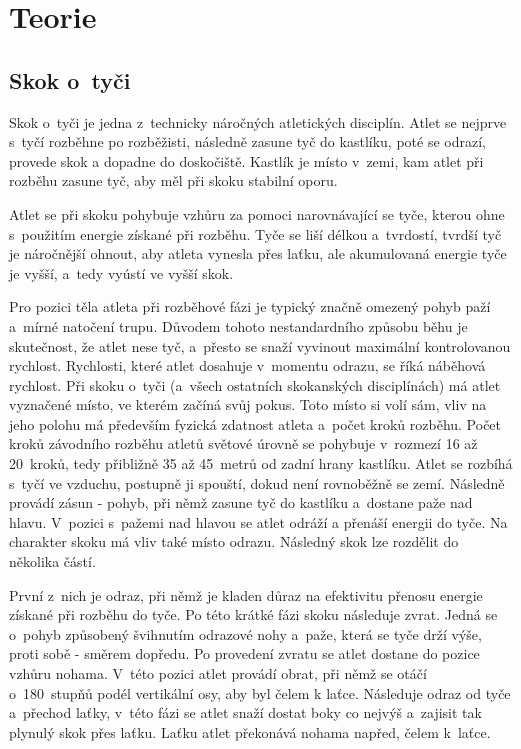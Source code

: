 \chapter{Teorie}

\section{Skok o~tyči}

Skok o~tyči je jedna z~technicky náročných atletických disciplín. Atlet se nejprve s~tyčí rozběhne po rozběžisti, následně zasune tyč do kastlíku, poté se odrazí, provede skok a dopadne do doskočiště. Kastlík je místo v~zemi, kam atlet při rozběhu zasune tyč, aby měl při skoku stabilní oporu.

Atlet se při skoku pohybuje vzhůru za pomoci narovnávající se tyče, kterou ohne s~použitím energie získané při rozběhu. Tyče se liší délkou a~tvrdostí, tvrdší tyč je náročnější ohnout, aby atleta vynesla přes laťku, ale akumulovaná energie tyče je vyšší, a~tedy vyústí ve vyšší skok.

Pro pozici těla atleta při rozběhové fázi je typický značně omezený pohyb paží a~mírné natočení trupu. Důvodem tohoto nestandardního způsobu běhu je skutečnost, že atlet nese tyč, a~přesto se snaží vyvinout maximální kontrolovanou rychlost. Rychlosti, které atlet dosahuje v~momentu odrazu, se říká náběhová rychlost. Při skoku o~tyči (a~všech ostatních skokanských disciplínách) má atlet vyznačené místo, ve kterém začíná svůj pokus. Toto místo si volí sám, vliv na jeho polohu má především fyzická zdatnost atleta a~počet kroků rozběhu. Počet kroků závodního rozběhu atletů světové úrovně se pohybuje v~rozmezí 16 až 20~kroků, tedy přibližně 35 až 45~metrů od zadní hrany kastlíku. Atlet se rozbíhá s~tyčí ve vzduchu, postupně ji spouští, dokud není rovnoběžně se zemí. Následně provádí zásun - pohyb, při němž zasune tyč do kastlíku a~dostane paže nad hlavu. V~pozici s~pažemi nad hlavou se atlet odráží a přenáší energii do tyče. Na charakter skoku má vliv také místo odrazu. Následný skok lze rozdělit do několika částí.

První z~nich je odraz, při němž je kladen důraz na efektivitu přenosu energie získané při rozběhu do tyče. Po této krátké fázi skoku následuje zvrat. Jedná se o~pohyb způsobený švihnutím odrazové nohy a~paže, která se tyče drží výše, proti sobě - směrem dopředu. Po provedení zvratu se atlet dostane do pozice vzhůru nohama. V~této pozici atlet provádí obrat, při němž se otáčí o~180~stupňů podél vertikální osy, aby byl čelem k laťce. Následuje odraz od tyče a~přechod laťky, v~této fázi se atlet snaží dostat boky co nejvýš a~zajisit tak plynulý skok přes laťku. Laťku atlet překonává nohama napřed, čelem k~laťce.

